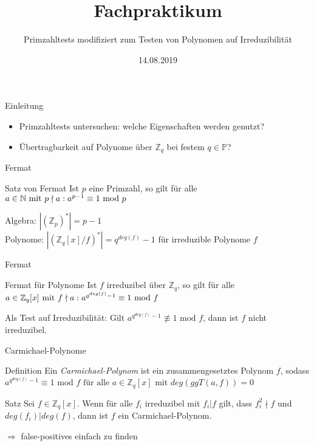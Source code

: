 \documentclass[german,10pt,xcolor=colortbl,compress]{beamer}%
\title{Fachpraktikum}
\subtitle{Primzahltests modifiziert zum Testen von Polynomen auf Irreduzibilität}
\date[]{14.08.2019} %
\newcommand{\ZZ}{\mathbb{Z}}
\newcommand{\NN}{\mathbb{N}}
\newcommand{\PP}{\mathbb{P}}
\begin{document}
	\maketitle
		
	\begin{frame}{Einleitung}	
		\begin{itemize}
			\item Primzahltests untersuchen: welche Eigenschaften werden genutzt?
			\item Übertragbarkeit auf Polynome über $\ZZ_q$ bei festem $q \in \PP$?	
		\end{itemize}
	\end{frame}
	
	
	\begin{frame}{Fermat}
		\begin{block}{Satz von Fermat}
			Ist $p$ eine Primzahl, so gilt für alle $ a \in \NN \text{ mit } p \nmid a:  
			\newline	
			a^{p-1} \equiv 1 \text{ mod } p $	
		\end{block}
	
		\medskip
		Algebra: $|(\ZZ_p)^*| = p-1$ \\
		\medskip
		Polynome: $ |(\ZZ_q[x]/f)^*| = q^{deg(f)}-1 $ für irreduzible Polynome $f$	
	\end{frame}
	
	
	\begin{frame}{Fermat}
		\begin{block}{Fermat für Polynome}
			Ist $f$ irreduzibel über $\ZZ_q$, so gilt für alle $ a \in \ZZ_q[x] \text{ mit } f \nmid a:
			 \newline a^{q^{deg(f)}-1}  \equiv 1 \text{ mod } f$
		\end{block}
		\medskip
		Als Test auf Irreduzibilität: Gilt $a^{q^{deg(f)}-1}  \not\equiv 1 \text{ mod } f$, dann ist $f$ nicht irreduzibel.
	\end{frame}


	\begin{frame}{Carmichael-Polynome}
		\begin{block}{Definition}
			Ein \emph{Carmichael-Polynom} ist ein zusammengesetztes Polynom $f$, sodass $a^{q^{deg(f)}-1}  \equiv 1 \text{ mod } f \text{ für alle } a \in \ZZ_q[x] \text{ mit } deg(ggT(a,f))=0$
		\end{block}
		\begin{block}{Satz}
			Sei $f\in \ZZ_q[x]$. Wenn für alle $f_i$ irreduzibel mit $f_i|f$ gilt, dass $f_i^2 \nmid f$ und $deg(f_i)|deg(f)$, dann ist $f$ ein Carmichael-Polynom.
		\end{block}
		\vspace{0.5cm}
		$\Rightarrow$ false-positives einfach zu finden
	\end{frame}
\end{document}
